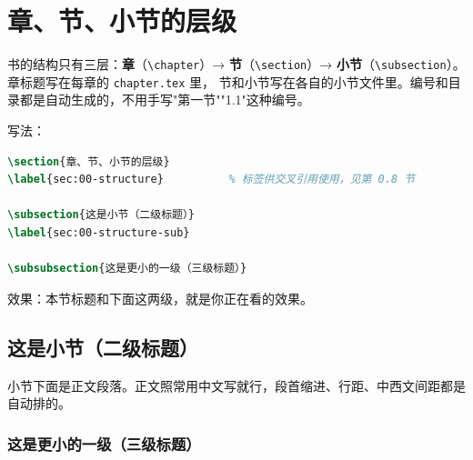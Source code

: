 \section{章、节、小节的层级}
\label{sec:00-structure}

书的结构只有三层：\textbf{章}（\verb|\chapter|）→ \textbf{节}（\verb|\section|）→
\textbf{小节}（\verb|\subsection|）。章标题写在每章的 \texttt{chapter.tex} 里，
节和小节写在各自的小节文件里。编号和目录都是自动生成的，不用手写"第一节""1.1"这种编号。

写法：

\begin{lstlisting}[language=TeX]
\section{章、节、小节的层级}
\label{sec:00-structure}          % 标签供交叉引用使用，见第 0.8 节

\subsection{这是小节（二级标题）}
\label{sec:00-structure-sub}

\subsubsection{这是更小的一级（三级标题）}
\end{lstlisting}

效果：本节标题和下面这两级，就是你正在看的效果。

\subsection{这是小节（二级标题）}
\label{sec:00-structure-sub}

小节下面是正文段落。正文照常用中文写就行，段首缩进、行距、中西文间距都是自动排的。

\subsubsection{这是更小的一级（三级标题）}

